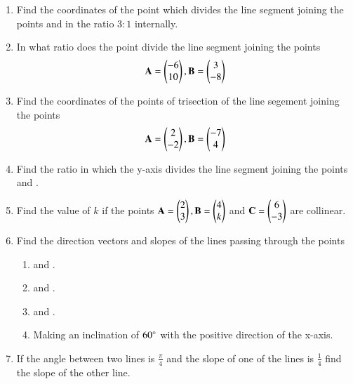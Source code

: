 \begin{enumerate}[label=\arabic*.,ref=\thesubsection.\theenumi]
\begin{figure}[!ht]
\caption{}
\label{fig:section}
\end{figure}
\item Find the coordinates of the point which divides the line segment joining the points  and  in the ratio $3:1$ internally.
\item In what ratio does the point  divide the line segment joining the points 
%
\begin{align}
\mathbf{A} = \begin{pmatrix}-6\\10\end{pmatrix},
\mathbf{B} = \begin{pmatrix}3\\-8\end{pmatrix}
\end{align}
%
\item Find the coordinates of the points of trisection of the line segement joining the points
%
\begin{align}
\mathbf{A} = \begin{pmatrix}2\\-2\end{pmatrix},
\mathbf{B} = \begin{pmatrix}-7\\4\end{pmatrix}
\end{align}
%
\item Find the ratio in which the y-axis divides the line segment joining the points  and .
\item Find the value of $k$ if the points $\mathbf{A}=\begin{pmatrix}2\\3\end{pmatrix}, \mathbf{B}=\begin{pmatrix}4\\k\end{pmatrix}$ and $\mathbf{C}=\begin{pmatrix}6\\-3\end{pmatrix}$ are collinear.
\item Find the direction vectors and slopes of the lines passing through the points
%
\begin{enumerate}
\item {} and .
\item {} and .
\item {} and .
\item Making an inclination of $60\degree$ with the positive direction of the x-axis.
\end{enumerate}
%
\item If the angle between two lines is $\frac{\pi}{4}$ and the slope of one of the lines is $\frac{1}{4}$ find the slope of the other line.

\end{enumerate}
